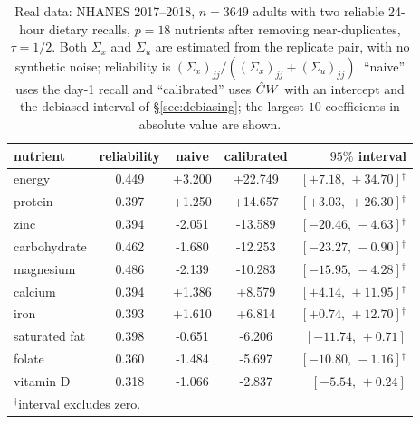 \begin{table}[ht]
\centering
\footnotesize
\setlength{\tabcolsep}{4pt}
\caption{Real data: NHANES 2017--2018, $n=3649$ adults with two reliable 24-hour dietary recalls, $p=18$ nutrients after removing near-duplicates, $\tau=1/2$. Both $\Sigma_x$ and $\Sigma_u$ are estimated from the replicate pair, with no synthetic noise; reliability is $(\Sigma_x)_{jj}/((\Sigma_x)_{jj}+(\Sigma_u)_{jj})$. ``naive'' uses the day-1 recall and ``calibrated'' uses $\hat{C} W$ with an intercept and the debiased interval of \S\ref{sec:debiasing}; the largest $10$ coefficients in absolute value are shown.}
\label{tab:nhanes}
\begin{tabular}{lcccr}
\toprule
nutrient & reliability & naive & calibrated & $95\%$ interval \\
\midrule
energy & 0.449 & +3.200 & +22.749 & $[+7.18,\, +34.70]$$^{\dagger}$ \\
protein & 0.397 & +1.250 & +14.657 & $[+3.03,\, +26.30]$$^{\dagger}$ \\
zinc & 0.394 & -2.051 & -13.589 & $[-20.46,\, -4.63]$$^{\dagger}$ \\
carbohydrate & 0.462 & -1.680 & -12.253 & $[-23.27,\, -0.90]$$^{\dagger}$ \\
magnesium & 0.486 & -2.139 & -10.283 & $[-15.95,\, -4.28]$$^{\dagger}$ \\
calcium & 0.394 & +1.386 & +8.579 & $[+4.14,\, +11.95]$$^{\dagger}$ \\
iron & 0.393 & +1.610 & +6.814 & $[+0.74,\, +12.70]$$^{\dagger}$ \\
saturated fat & 0.398 & -0.651 & -6.206 & $[-11.74,\, +0.71]$ \\
folate & 0.360 & -1.484 & -5.697 & $[-10.80,\, -1.16]$$^{\dagger}$ \\
vitamin D & 0.318 & -1.066 & -2.837 & $[-5.54,\, +0.24]$ \\
\midrule
\multicolumn{5}{l}{$^{\dagger}$interval excludes zero.}\\
\bottomrule
\end{tabular}
\end{table}
